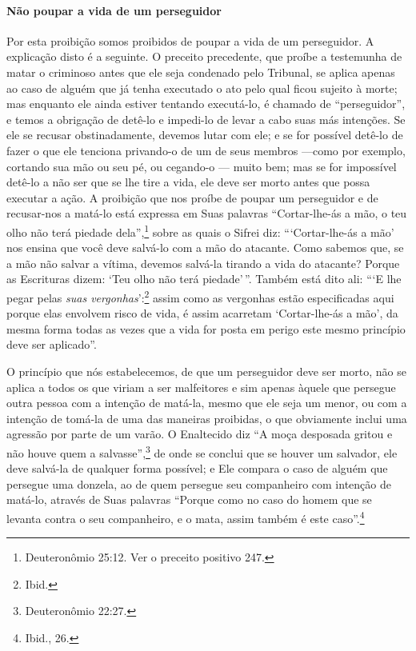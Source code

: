 \paragraph{Não poupar a vida de um perseguidor}

Por esta proibição somos proibidos de poupar a vida de um perseguidor. A
explicação disto é a seguinte. O preceito precedente, que proíbe a
testemunha de matar o criminoso antes que ele seja condenado pelo Tribunal,
se aplica apenas ao caso de alguém que já tenha executado o ato pelo
qual ficou sujeito à morte; mas enquanto ele ainda estiver tentando
executá-lo, é chamado de ``perseguidor'', e temos a obrigação de detê-lo
e impedi-lo de levar a cabo suas más intenções. Se ele se recusar
obstinadamente, devemos lutar com ele; e se for possível detê-lo de
fazer o que ele tenciona privando-o de um de seus membros ---como por
exemplo, cortando sua mão ou seu pé, ou cegando-o --- muito bem; mas se
for impossível detê-lo a não ser que se lhe tire a vida, ele deve ser
morto antes que possa executar a ação. A proibição que nos proíbe de
poupar um perseguidor e de recusar-nos a matá-lo está expressa em Suas
palavras ``Cortar-lhe-ás a mão, o teu olho não terá piedade dela'',\footnote{Deuteronômio 25:12. Ver o preceito positivo 247.} sobre as quais o Sifrei diz:
```Cortar-lhe-ás a mão' nos ensina que você deve salvá-lo com a mão do
atacante. Como sabemos que, se a mão não salvar a vítima, devemos
salvá-la tirando a vida do atacante? Porque as Escrituras dizem: `Teu
olho não terá piedade'\,''. Também está dito ali: ```E lhe pegar pelas
\emph{suas vergonhas}':\footnote{Ibid.} assim como as vergonhas estão
especificadas aqui porque elas envolvem risco de vida, é assim acarretam
`Cortar-lhe-ás a mão', da mesma forma todas as vezes que a vida for
posta em perigo este mesmo princípio deve ser aplicado''.

O princípio que nós estabelecemos, de que um perseguidor deve ser morto,
não se aplica a todos os que viriam a ser malfeitores e sim apenas
àquele que persegue outra pessoa com a intenção de matá-la, mesmo que
ele seja um menor, ou com a intenção de tomá-la de uma das maneiras
proibidas, o que obviamente inclui uma agressão por parte de um varão. O
Enaltecido diz ``A moça desposada gritou e não houve quem a salvasse'',\footnote{Deuteronômio 22:27.} de onde se conclui que se houver um salvador, ele
deve salvá-la de qualquer forma possível; e Ele compara o caso de alguém
que persegue uma donzela, ao de quem persegue seu companheiro com
intenção de matá-lo, através de Suas palavras ``Porque como no caso do
homem que se levanta contra o seu companheiro, e o mata, assim também é
este caso''.\footnote{Ibid., 26.}

